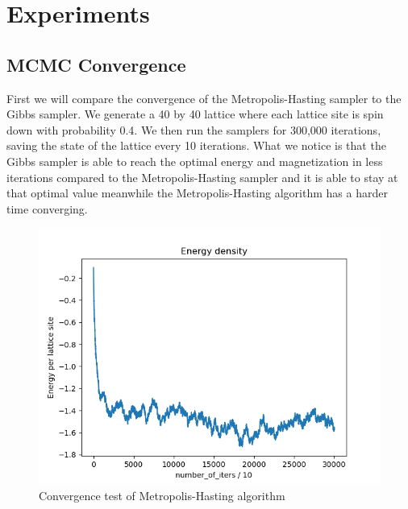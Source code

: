 \documentclass{article}
\begin{document}
\section{Experiments}
\subsection{MCMC Convergence}
    First we will compare the convergence of the Metropolis-Hasting sampler to the Gibbs sampler.
    We generate a 40 by 40 lattice where each lattice site is spin down with probability 0.4. We then run the
    samplers for 300,000 iterations, saving the state of the lattice every 10 iterations. What we notice is that
    the Gibbs sampler is able to reach the optimal energy and magnetization in less iterations compared to the 
    Metropolis-Hasting sampler and it is able to stay at that optimal value meanwhile the Metropolis-Hasting algorithm
    has a harder time converging. 

    \begin{figure}[ht]
        \includegraphics[width=\columnwidth]{plots/energy_density_mh.png}
        \caption{Convergence test of Metropolis-Hasting algorithm}
        \label{fig:3}
    \end{figure}
\end{document}
